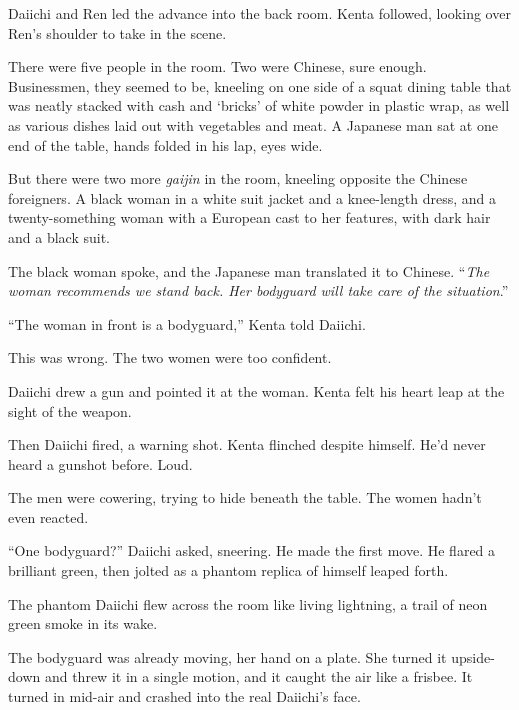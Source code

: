 Daiichi and Ren led the advance into the back room.  Kenta followed, looking over Ren's shoulder to take in the scene.



There were five people in the room.  Two were Chinese, sure enough.  Businessmen, they seemed to be, kneeling on one side of a squat dining table that was neatly stacked with cash and `bricks' of white powder in plastic wrap, as well as various dishes laid out with vegetables and meat.  A Japanese man sat at one end of the table, hands folded in his lap, eyes wide.



But there were two more \emph{gaijin }in the room, kneeling opposite the Chinese foreigners.  A black woman in a white suit jacket and a knee-length dress, and a twenty-something woman with a European cast to her features, with dark hair and a black suit.



The black woman spoke, and the Japanese man translated it to Chinese.  ``\emph{The woman recommends we stand back.  Her bodyguard will take care of the situation}.''



``The woman in front is a bodyguard,'' Kenta told Daiichi.



This was wrong.  The two women were too confident.



Daiichi drew a gun and pointed it at the woman.  Kenta felt his heart leap at the sight of the weapon.



Then Daiichi fired, a warning shot.  Kenta flinched despite himself.  He'd never heard a gunshot before.  Loud.



The men were cowering, trying to hide beneath the table.  The women hadn't even reacted.



``One bodyguard?'' Daiichi asked, sneering.  He made the first move.  He flared a brilliant green, then jolted as a phantom replica of himself leaped forth.



The phantom Daiichi flew across the room like living lightning, a trail of neon green smoke in its wake.



The bodyguard was already moving, her hand on a plate.  She turned it upside-down and threw it in a single motion, and it caught the air like a frisbee.  It turned in mid-air and crashed into the real Daiichi's face.




